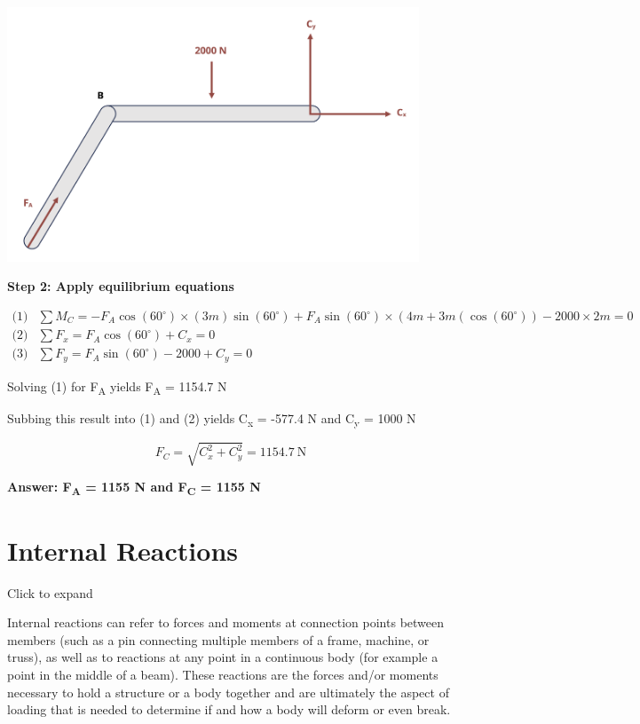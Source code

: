 \documentclass[
  letterpaper,
  DIV=11,
  numbers=noendperiod]{scrreprt}
\begin{document}
\begin{tcolorbox}
\begin{center}
\includegraphics[width=4.83333in,height=\textheight]{images/CH1 PNGs/example 1.2 part 3.png}
\end{center}

\textbf{Step 2: Apply equilibrium equations}

\[
\begin{aligned}
\text{(1)}& \sum M_C=-F_A \cos \left(60^{\circ}\right) \times(3 m) \sin \left(60^{\circ}\right)+F_A \sin \left(60^{\circ}\right) \times\left(4 m+3 m\left(\cos \left(60^{\circ}\right)\right)-2000 \times 2 m=0\right. \\
\text{(2)}& \sum F_x=F_A \cos \left(60^{\circ}\right)+C_x=0 \\
\text{(3)}& \sum F_y=F_A \sin \left(60^{\circ}\right)-2000+C_y=0
\end{aligned}
\]

Solving (1) for F\textsubscript{A} yields F\textsubscript{A} = 1154.7 N

Subbing this result into (1) and (2) yields C\textsubscript{x} = -577.4
N and C\textsubscript{y} = 1000 N

\[
F_C=\sqrt{C_x^2+C_y^2}=1154.7 \mathrm{~N}
\]

\textbf{Answer: F\textsubscript{A} = 1155 N and F\textsubscript{C} =
1155 N}

\end{tcolorbox}

\section{Internal Reactions}\label{internal-reactions}

Click to expand

Internal reactions can refer to forces and moments at connection points
between members (such as a pin connecting multiple members of a frame,
machine, or truss), as well as to reactions at any point in a continuous
body (for example a point in the middle of a beam). These reactions are
the forces and/or moments necessary to hold a structure or a body
together and are ultimately the aspect of loading that is needed to
determine if and how a body will deform or even break.
\end{document}
